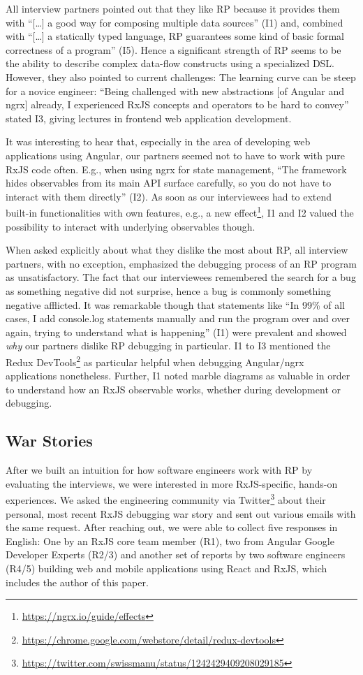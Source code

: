 \documentclass[sigplan,screen]{acmart}
\begin{document}
All interview partners pointed out that they like RP because it provides them with ``[\dots] a good way for composing multiple data sources'' (I1) and, combined with ``[\dots] a statically typed language, RP guarantees some kind of basic formal correctness of a program'' (I5). Hence a significant strength of RP seems to be the ability to describe complex data-flow constructs using a specialized DSL. However, they also pointed to current challenges: The learning curve can be steep for a novice engineer: ``Being challenged with new abstractions [of Angular and ngrx] already, I experienced RxJS concepts and operators to be hard to convey'' stated I3, giving lectures in frontend web application development.

It was interesting to hear that, especially in the area of developing web applications using Angular, our partners seemed not to have to work with pure RxJS code often. E.g., when using ngrx for state management, ``The framework hides observables from its main API surface carefully, so you do not have to interact with them directly'' (I2). As soon as our interviewees had to extend built-in functionalities with own features, e.g., a new effect\footnote{\url{https://ngrx.io/guide/effects}}, I1 and I2 valued the possibility to interact with underlying observables though.

When asked explicitly about what they dislike the most about RP, all interview partners, with no exception, emphasized the debugging process of an RP program as unsatisfactory. The fact that our interviewees remembered the search for a bug as something negative did not surprise, hence a bug is commonly something negative afflicted. It was remarkable though that statements like ``In 99\% of all cases, I add console.log statements manually and run the program over and over again, trying to understand what is happening'' (I1) were prevalent and showed \emph{why} our partners dislike RP debugging in particular. I1 to I3 mentioned the Redux DevTools\footnote{\url{https://chrome.google.com/webstore/detail/redux-devtools}} as particular helpful when debugging Angular/ngrx applications nonetheless. Further, I1 noted marble diagrams as valuable in order to understand how an RxJS observable works, whether during development or debugging.

\subsection{War Stories}

After we built an intuition for how software engineers work with RP by evaluating the interviews, we were interested in more RxJS-specific, hands-on experiences. We asked the engineering community via Twitter\footnote{\url{https://twitter.com/swissmanu/status/1242429409208029185}} about their personal, most recent RxJS debugging war story and sent out various emails with the same request. After reaching out, we were able to collect five responses in English: One by an RxJS core team member (R1), two from Angular Google Developer Experts (R2/3) and another set of reports by two software engineers (R4/5) building web and mobile applications using React and RxJS, which includes the author of this paper.
\end{document}
